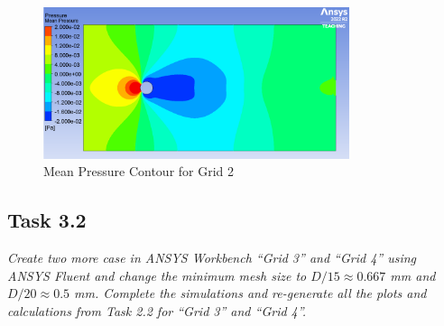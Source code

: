 \begin{figure}[H]
    \centering
    \includegraphics[width=0.8\textwidth]{Questions/Figures/mean pressure grid 2.png}
    \caption{Mean Pressure Contour for Grid 2}
\end{figure}

\subsection*{Task 3.2}
\textit{Create two more case in ANSYS Workbench “Grid 3” and “Grid 4” using ANSYS Fluent and change the minimum mesh size to $D/15 \approx 0.667$ mm and $D/20 \approx 0.5$ mm. Complete the simulations and re-generate all the plots and calculations from Task 2.2 for “Grid 3” and “Grid 4”.}


